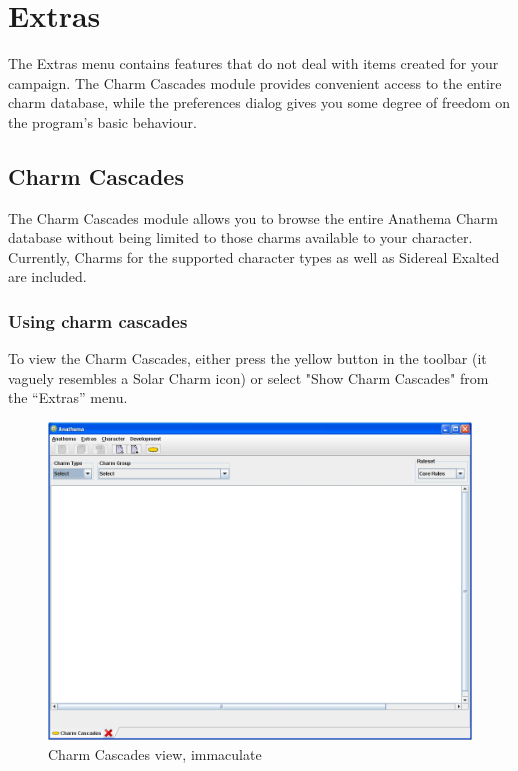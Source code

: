 \chapter{Extras}
The Extras menu contains features that do not deal with items created for your campaign. The Charm Cascades module provides convenient access to the entire charm database, while the preferences dialog gives you some degree of freedom on the program's basic behaviour.

\section{Charm Cascades}
The Charm Cascades module allows you to browse the entire Anathema Charm database without being limited to those charms available to your character. Currently, Charms for the supported character types as well as Sidereal Exalted are included.

\subsection{Using charm cascades}
To view the Charm Cascades, either press the yellow button in the toolbar (it vaguely resembles a Solar Charm icon) or select "Show Charm Cascades" from the ``Extras'' menu. 

\begin{figure}[htb]
	\centering
		\includegraphics[width=1.00\textwidth]{Images/CharmCascadesEmpty.jpg}
	\caption{Charm Cascades view, immaculate}
	\label{fig:CharmCascadesEmpty}
\end{figure}

